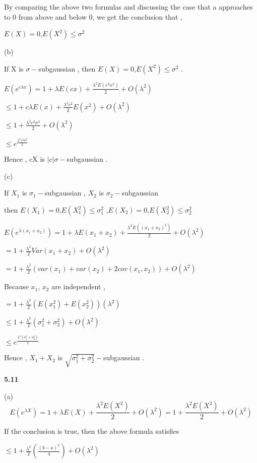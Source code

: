 By comparing the above two formulas and discussing the case that a approaches to 0 from above and below 0, we get the conclusion that ,

$E(X)=0$,$E(X^2)\leq\sigma^2$

(b)

If X is $\sigma-$subgaussian , then $E(X)=0$,$E(X^2)\leq\sigma^2$ .

$E(e^{c\lambda x}) = 1+\lambda E(cx)+\frac{\lambda^2 E(c^2 x^2)}{2}+O(\lambda^2)$

$\leq 1+c\lambda E(x)+\frac{\lambda^2 c^2}{2} E(x^2)+O(\lambda^2)$

$\leq 1+\frac{\lambda^2 c^2 \sigma^2}{2}+O(\lambda^2)$

$\leq e^{\frac{\lambda^2 c^2 \sigma^2}{2}}$

Hence , cX is $|c|\sigma-$subgaussian .

(c)

If $X_1$ is $\sigma_1-$subgaussian , $X_2$ is $\sigma_2-$subgaussian

then $E(X_1)=0$,$E(X_1^2)\leq\sigma_1^2$ ,$E(X_2)=0$,$E(X_2^2)\leq\sigma_2^2$

$E(e^{\lambda (x_1+x_2)}) = 1+\lambda E(x_1+x_2)+\frac{\lambda^2 E((x_1+x_2)^2)}{2}+O(\lambda^2)$

$= 1+\frac{\lambda^2}{2} Var(x_1+x_2)+O(\lambda^2)$

$= 1+\frac{\lambda^2}{2} (var(x_1)+var(x_2)+2cov(x_1,x_2))+O(\lambda^2)$

Because $x_1$, $x_2$ are independent ,

$= 1+\frac{\lambda^2}{2} (E(x_1^2) + E(x_2^2))(\lambda^2)$

$\leq 1+\frac{\lambda^2}{2} (\sigma_1^2 + \sigma_2^2)+O(\lambda^2)$

$\leq e^{\frac{\lambda^2 (\sigma_1^2 + \sigma_2^2)}{2}}$

Hence , $X_1+X_2$ is $\sqrt{\sigma_1^2 + \sigma_2^2}-$subgaussian .




\noindent\textbf{5.11}




(a)
\begin{equation}
E(e^{\lambda X}) = 1+\lambda E(X)+\frac{\lambda^2 E(X^2)}{2}+O(\lambda^2) =1+\frac{\lambda^2 E(X^2)}{2}+O(\lambda^2)
\end{equation}

If the conclusion is true, then the above formula satisfies

$\leq 1+\frac{\lambda^2}{2}(\frac{(b-a)^2}{4})+O(\lambda^2)$

